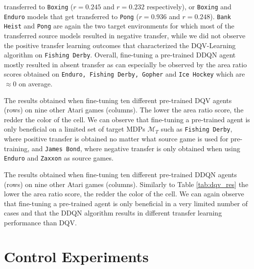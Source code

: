 transferred to \texttt{Boxing} ($r=0.245$ and $r=0.232$ respectively), or \texttt{Boxing} and \texttt{Enduro} models that get transferred to \texttt{Pong} ($r=0.936$ and $r=0.248$). \texttt{Bank Heist} and \texttt{Pong} are again the two target environments for which most of the transferred source models resulted in negative transfer, while we did not observe the positive transfer learning outcomes that characterized the DQV-Learning algorithm on \texttt{Fishing Derby}. Overall, fine-tuning a pre-trained DDQN agent mostly resulted in absent transfer as can especially be observed by the area ratio scores obtained on \texttt{Enduro, Fishing Derby, Gopher} and \texttt{Ice Hockey} which are $\approx 0$ on average.  

\begin{table}[ht!]
	\caption{The results obtained when fine-tuning ten different pre-trained DQV agents (rows) on nine other Atari games (columns). The lower the area ratio score, the redder the color of the cell. We can observe that fine-tuning a pre-trained agent is only beneficial on a limited set of target MDPs $\mathcal{M}_T$ such as \texttt{Fishing Derby}, where positive transfer is obtained no matter what source game is used for pre-training, and \texttt{James Bond}, where negative transfer is only obtained when using \texttt{Enduro} and \texttt{Zaxxon} as source games.}
	
	\label{tab:dqv_res}
\end{table}


\begin{table}[ht!]
	\caption{The results obtained when fine-tuning ten different pre-trained DDQN agents (rows) on nine other Atari games (columns). Similarly to Table \ref{tab:dqv_res} the lower the area ratio score, the redder the color of the cell. We can again observe that fine-tuning a pre-trained agent is only beneficial in a very limited number of cases and that the DDQN algorithm results in different transfer learning performance than DQV.}
	
	\label{tab:ddqn_res}
\end{table}


\section{Control Experiments}

